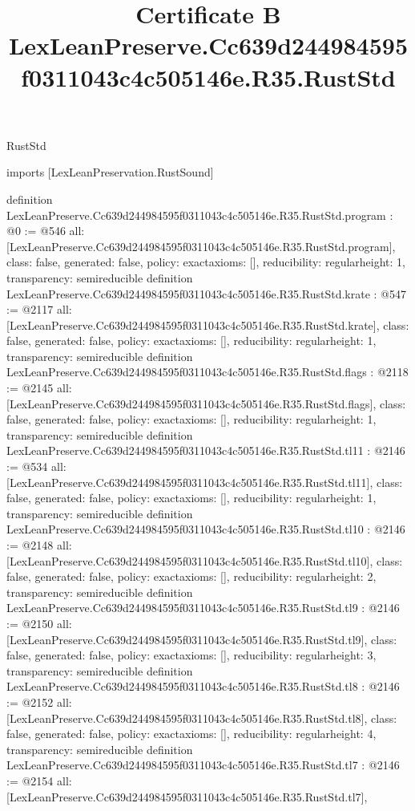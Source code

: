 \begin{lexlean}{RustStd}
\title{Certificate B LexLeanPreserve.Cc639d244984595f0311043c4c505146e.R35.RustStd}
\begin{coremodule}
imports [LexLeanPreservation.RustSound]

definition LexLeanPreserve.Cc639d244984595f0311043c4c505146e.R35.RustStd.program : @0 := @546 {
  all: [LexLeanPreserve.Cc639d244984595f0311043c4c505146e.R35.RustStd.program],
  class: false,
  generated: false,
  policy: exact{axioms: []},
  reducibility: regular{height: 1},
  transparency: semireducible
}
definition LexLeanPreserve.Cc639d244984595f0311043c4c505146e.R35.RustStd.krate : @547 := @2117 {
  all: [LexLeanPreserve.Cc639d244984595f0311043c4c505146e.R35.RustStd.krate],
  class: false,
  generated: false,
  policy: exact{axioms: []},
  reducibility: regular{height: 1},
  transparency: semireducible
}
definition LexLeanPreserve.Cc639d244984595f0311043c4c505146e.R35.RustStd.flags : @2118 := @2145 {
  all: [LexLeanPreserve.Cc639d244984595f0311043c4c505146e.R35.RustStd.flags],
  class: false,
  generated: false,
  policy: exact{axioms: []},
  reducibility: regular{height: 1},
  transparency: semireducible
}
definition LexLeanPreserve.Cc639d244984595f0311043c4c505146e.R35.RustStd.tl11 : @2146 := @534 {
  all: [LexLeanPreserve.Cc639d244984595f0311043c4c505146e.R35.RustStd.tl11],
  class: false,
  generated: false,
  policy: exact{axioms: []},
  reducibility: regular{height: 1},
  transparency: semireducible
}
definition LexLeanPreserve.Cc639d244984595f0311043c4c505146e.R35.RustStd.tl10 : @2146 := @2148 {
  all: [LexLeanPreserve.Cc639d244984595f0311043c4c505146e.R35.RustStd.tl10],
  class: false,
  generated: false,
  policy: exact{axioms: []},
  reducibility: regular{height: 2},
  transparency: semireducible
}
definition LexLeanPreserve.Cc639d244984595f0311043c4c505146e.R35.RustStd.tl9 : @2146 := @2150 {
  all: [LexLeanPreserve.Cc639d244984595f0311043c4c505146e.R35.RustStd.tl9],
  class: false,
  generated: false,
  policy: exact{axioms: []},
  reducibility: regular{height: 3},
  transparency: semireducible
}
definition LexLeanPreserve.Cc639d244984595f0311043c4c505146e.R35.RustStd.tl8 : @2146 := @2152 {
  all: [LexLeanPreserve.Cc639d244984595f0311043c4c505146e.R35.RustStd.tl8],
  class: false,
  generated: false,
  policy: exact{axioms: []},
  reducibility: regular{height: 4},
  transparency: semireducible
}
definition LexLeanPreserve.Cc639d244984595f0311043c4c505146e.R35.RustStd.tl7 : @2146 := @2154 {
  all: [LexLeanPreserve.Cc639d244984595f0311043c4c505146e.R35.RustStd.tl7],
}
\end{coremodule}
\end{lexlean}
